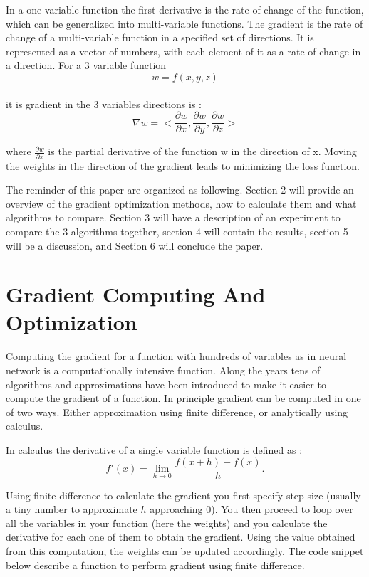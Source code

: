 \documentclass[12pt,twoside]{article}
\theoremstyle{plain}
\theoremstyle{definition}
\theoremstyle{remark}
\begin{document}
In a one variable function the first derivative is the rate of change of the function, which can be generalized into multi-variable functions. The gradient is the rate of change of a multi-variable function in a specified set of directions. It is represented as a vector of numbers, with each element of it as a rate of change in a direction. For a 3 variable function
\begin{equation}
  w=f(x,y,z)
\end{equation}
\\it is gradient in the 3 variables directions is :
\begin{equation}
 \nabla w = \bigg<  \frac{\partial w}{\partial x}, \frac{\partial w}{\partial y}, \frac{\partial w}{\partial z} \bigg>
\end{equation}

where $\frac{\partial w}{\partial x}$ is the partial derivative of the function w in the direction of x.
Moving the weights in the direction of the gradient leads to minimizing the loss function.

The reminder of this paper are organized as following. Section 2 will provide an overview of the gradient optimization methods, how to calculate them and what algorithms to compare. Section 3 will have a description of an experiment to compare the 3 algorithms together, section 4 will contain the results, section 5 will be a discussion, and Section 6 will conclude the paper.

\section{Gradient Computing And Optimization}
\label{sec:basics}
Computing the gradient for a function with hundreds of variables as in neural network is a computationally intensive function. Along the years tens of algorithms and approximations have been introduced to make it easier to compute the gradient of a function. In principle gradient can be computed in one of two ways. Either approximation using finite difference, or analytically using calculus.

In calculus the derivative of a single variable function is defined as :
\begin{equation}
  f'(x)=\lim_{h\to 0}\frac{f(x+h)-f(x)}{h}.
\end{equation}

Using finite difference to calculate the gradient you first specify step size (usually a tiny number to approximate $h$ approaching $0$). You then proceed to loop over all the variables in your function (here the weights) and you calculate the derivative for each one of them to obtain the gradient. Using the value obtained from this computation, the weights can be updated accordingly. The code snippet below describe a function to perform gradient using finite difference.
\end{document}
